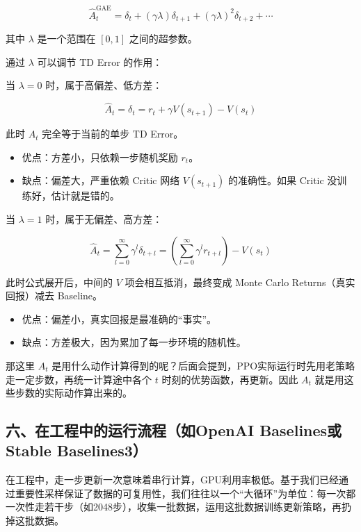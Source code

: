 \[
\hat{A}_t^{\mathrm{GAE}}
=
\delta_t+(\gamma\lambda)\delta_{t+1}+(\gamma\lambda)^{2}\delta_{t+2}+\cdots
\]

其中 \(\lambda\) 是一个范围在 \([0,1]\) 之间的超参数。

通过 \(\lambda\) 可以调节 TD Error 的作用：

当 \(\lambda=0\) 时，属于高偏差、低方差：

\[
\hat{A}_t=\delta_t=r_t+\gamma V(s_{t+1})-V(s_t)
\]

此时 \(A_t\) 完全等于当前的单步 TD Error。

\begin{itemize}
\tightlist
\item
  优点：方差小，只依赖一步随机奖励 \(r_t\)。
\item
  缺点：偏差大，严重依赖 Critic 网络 \(V(s_{t+1})\) 的准确性。如果 Critic 没训练好，估计就是错的。
\end{itemize}

当 \(\lambda=1\) 时，属于无偏差、高方差：

\[
\hat{A}_t=\sum_{l=0}^{\infty}\gamma^{l}\delta_{t+l}=\left(\sum_{l=0}^{\infty}\gamma^{l}r_{t+l}\right)-V(s_t)
\]

此时公式展开后，中间的 \(V\) 项会相互抵消，最终变成 Monte Carlo Returns（真实回报）减去 Baseline。

\begin{itemize}
\tightlist
\item
  优点：偏差小，真实回报是最准确的``事实''。
\item
  缺点：方差极大，因为累加了每一步环境的随机性。
\end{itemize}

那这里 \(A_t\) 是用什么动作计算得到的呢？后面会提到，PPO实际运行时先用老策略走一定步数，再统一计算途中各个 \(t\) 时刻的优势函数，再更新。因此 \(A_t\) 就是用这些步数的实际动作算出来的。

\hypertarget{ux516dux5728ux5de5ux7a0bux4e2dux7684ux8fd0ux884cux6d41ux7a0bux5982openai-baselinesux6216stable-baselines3}{%
\subsection{六、在工程中的运行流程（如OpenAI Baselines或Stable Baselines3）}\label{ux516dux5728ux5de5ux7a0bux4e2dux7684ux8fd0ux884cux6d41ux7a0bux5982openai-baselinesux6216stable-baselines3}}

在工程中，走一步更新一次意味着串行计算，GPU利用率极低。基于我们已经通过重要性采样保证了数据的可复用性，我们往往以一个``大循环''为单位：每一次都一次性走若干步（如2048步），收集一批数据，运用这批数据训练更新策略，再扔掉这批数据。

